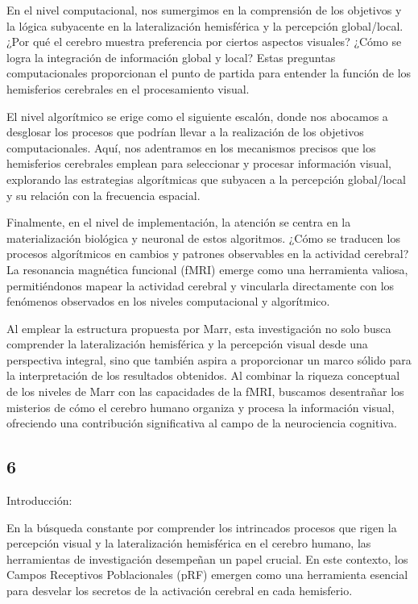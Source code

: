 \documentclass{article}
\begin{document}
	En el nivel computacional, nos sumergimos en la comprensión de los objetivos y la lógica subyacente en la lateralización hemisférica y la percepción global/local. ¿Por qué el cerebro muestra preferencia por ciertos aspectos visuales? ¿Cómo se logra la integración de información global y local? Estas preguntas computacionales proporcionan el punto de partida para entender la función de los hemisferios cerebrales en el procesamiento visual.
	
	El nivel algorítmico se erige como el siguiente escalón, donde nos abocamos a desglosar los procesos que podrían llevar a la realización de los objetivos computacionales. Aquí, nos adentramos en los mecanismos precisos que los hemisferios cerebrales emplean para seleccionar y procesar información visual, explorando las estrategias algorítmicas que subyacen a la percepción global/local y su relación con la frecuencia espacial.
	
	Finalmente, en el nivel de implementación, la atención se centra en la materialización biológica y neuronal de estos algoritmos. ¿Cómo se traducen los procesos algorítmicos en cambios y patrones observables en la actividad cerebral? La resonancia magnética funcional (fMRI) emerge como una herramienta valiosa, permitiéndonos mapear la actividad cerebral y vincularla directamente con los fenómenos observados en los niveles computacional y algorítmico.
	
	Al emplear la estructura propuesta por Marr, esta investigación no solo busca comprender la lateralización hemisférica y la percepción visual desde una perspectiva integral, sino que también aspira a proporcionar un marco sólido para la interpretación de los resultados obtenidos. Al combinar la riqueza conceptual de los niveles de Marr con las capacidades de la fMRI, buscamos desentrañar los misterios de cómo el cerebro humano organiza y procesa la información visual, ofreciendo una contribución significativa al campo de la neurociencia cognitiva.
	
	\subsection{6}
	
	Introducción:
	
	En la búsqueda constante por comprender los intrincados procesos que rigen la percepción visual y la lateralización hemisférica en el cerebro humano, las herramientas de investigación desempeñan un papel crucial. En este contexto, los Campos Receptivos Poblacionales (pRF) emergen como una herramienta esencial para desvelar los secretos de la activación cerebral en cada hemisferio.
	
\end{document}
